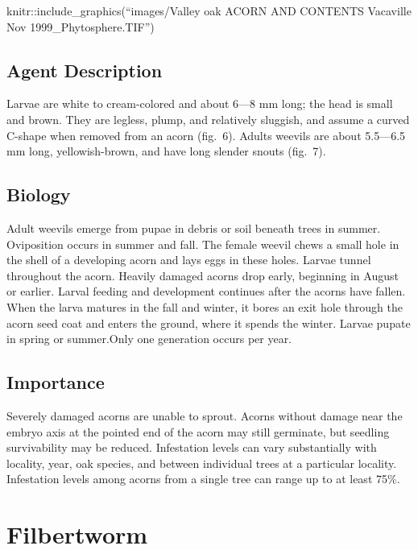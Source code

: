 \documentclass[
]{book}
\begin{document}
knitr::include\_graphics(``images/Valley oak ACORN AND CONTENTS Vacaville Nov 1999\_Phytosphere.TIF'')

\subsection*{Agent Description}\label{agent-description}

Larvae are white to cream-colored and about 6---8 mm long; the head is small and brown. They are legless, plump, and relatively sluggish, and assume a curved C-shape when removed from an acorn (fig.~6). Adults weevils are about 5.5---6.5 mm long, yellowish-brown, and have long slender snouts (fig.~7).

\subsection*{Biology}\label{biology}

Adult weevils emerge from pupae in debris or soil beneath trees in summer. Oviposition occurs in summer and fall. The female weevil chews a small hole in the shell of a developing acorn and lays eggs in these holes. Larvae tunnel throughout the acorn. Heavily damaged acorns drop early, beginning in August or earlier. Larval feeding and development continues after the acorns have fallen. When the larva matures in the fall and winter, it bores an exit hole through the acorn seed coat and enters the ground, where it spends the winter. Larvae pupate in spring or summer.Only one generation occurs per year.

\subsection*{Importance}\label{importance}

Severely damaged acorns are unable to sprout. Acorns without damage near the embryo axis at the pointed end of the acorn may still germinate, but seedling survivability may be reduced. Infestation levels can vary substantially with locality, year, oak species, and between individual trees at a particular locality. Infestation levels among acorns from a single tree can range up to at least 75\%.

\section*{Filbertworm}\label{filbertworm}
\end{document}
